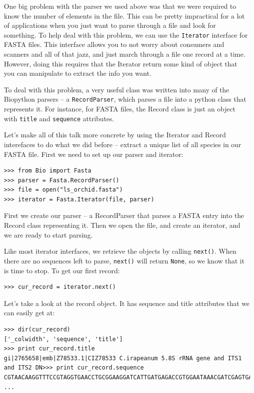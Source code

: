 \documentclass{report}
\begin{document}
One big problem with the parser we used above was that we were required to know the number of elements in the file. This can be pretty impractical for a lot of applications when you just want to parse through a file and look for something. To help deal with this problem, we can use the \verb|Iterator| interface for FASTA files. This interface allows you to not worry about consumers and scanners and all of that jazz, and just march through a file one record at a time. However, doing this requires that the Iterator return some kind of object that you can manipulate to extract the info you want.


To deal with this problem, a very useful class was written into many of the Biopython parsers -- a \verb|RecordParser|, which parses a file into a python class that represents it. For instance, for FASTA files, the Record class is just an object with \verb|title| and \verb|sequence| attributes. 


Let's make all of this talk more concrete by using the Iterator and Record interefaces to do what we did before -- extract a unique list of all species in our FASTA file. First we need to set up our parser and iterator:

\begin{verbatim}
>>> from Bio import Fasta
>>> parser = Fasta.RecordParser()
>>> file = open("ls_orchid.fasta")
>>> iterator = Fasta.Iterator(file, parser)
\end{verbatim}

First we create our parser -- a RecordParser that parses a FASTA entry into the Record class representing it. Then we open the file, and create an iterator, and we are ready to start parsing.


Like most iterator interfaces, we retrieve the objects by calling \verb|next()|. When there are no sequences left to parse, \verb|next()| will return \verb|None|, so we know that it is time to stop. To get our first record:

\begin{verbatim}
>>> cur_record = iterator.next()
\end{verbatim}

Let's take a look at the record object. It has sequence and title attributes that we can easily get at:

\begin{verbatim}
>>> dir(cur_record)
['_colwidth', 'sequence', 'title']
>>> print cur_record.title
gi|2765658|emb|Z78533.1|CIZ78533 C.irapeanum 5.8S rRNA gene and ITS1 and ITS2 DN>>> print cur_record.sequence
CGTAACAAGGTTTCCGTAGGTGAACCTGCGGAAGGATCATTGATGAGACCGTGGAATAAACGATCGAGTGAATCCGGA
...
\end{verbatim}
\end{document}
